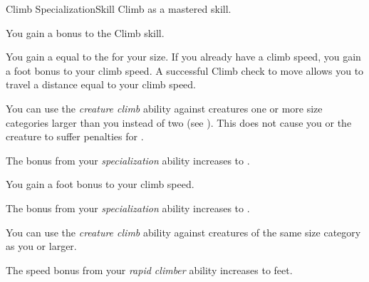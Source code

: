     \begin{feat}{Climb Specialization}{Skill}
        \featpre Climb as a mastered skill.

         You gain a  bonus to the Climb skill.

         You gain a  equal to the  for your size.
        If you already have a climb speed, you gain a  foot bonus to your climb speed.
        A successful Climb check to move allows you to travel a distance equal to your climb speed.

         You can use the \textit{creature climb} ability against creatures one or more size categories larger than you instead of two (see ).
        This does not cause you or the creature to suffer penalties for \squeezing.

         The bonus from your \textit{specialization} ability increases to .

         You gain a  foot bonus to your climb speed.

         The bonus from your \textit{specialization} ability increases to .

         You can use the \textit{creature climb} ability against creatures of the same size category as you or larger.

         The speed bonus from your \textit{rapid climber} ability increases to  feet.
    \end{feat}

